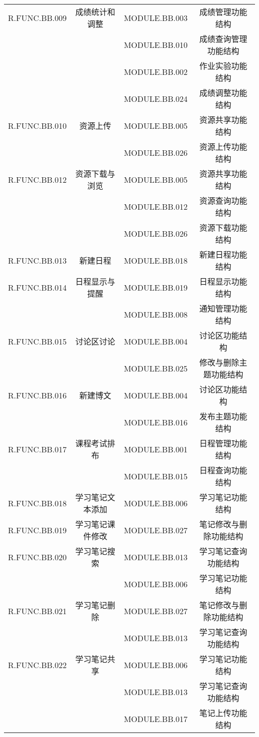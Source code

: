 \begin{longtable}{|c|c|c|c|}
R.FUNC.BB.009   &   成绩统计和调整   &    MODULE.BB.003   &   成绩管理功能结构     \\
    &   &   MODULE.BB.010   &   成绩查询管理功能结构  \\
    &   &   MODULE.BB.002  &  作业实验功能结构  \\ 
    &   &   MODULE.BB.024   & 成绩调整功能结构  \\

R.FUNC.BB.010   &   资源上传   &    MODULE.BB.005   &   资源共享功能结构   \\
    &   &   MODULE.BB.026  &  资源上传功能结构  \\

R.FUNC.BB.012   &   资源下载与浏览   &   MODULE.BB.005   &   资源共享功能结构   \\
    &   &   MODULE.BB.012  &  资源查询功能结构  \\
    &   &   MODULE.BB.026  &  资源下载功能结构  \\

R.FUNC.BB.013   &   新建日程   &   MODULE.BB.018   &   新建日程功能结构   \\

R.FUNC.BB.014   &   日程显示与提醒   &   MODULE.BB.019  &  日程显示功能结构   \\
    &   &   MODULE.BB.008  &  通知管理功能结构 \\

R.FUNC.BB.015   &   讨论区讨论   &  MODULE.BB.004   & 讨论区功能结构   \\
    &   &   MODULE.BB.025  &  修改与删除主题功能结构\\

R.FUNC.BB.016   &   新建博文   &   MODULE.BB.004  &  讨论区功能结构   \\
    &   &   MODULE.BB.016  &  发布主题功能结构  \\  

R.FUNC.BB.017   &   课程考试排布   &   MODULE.BB.001  &  日程管理功能结构   \\
    &   &   MODULE.BB.015  &  日程查询功能结构  \\

R.FUNC.BB.018   &   学习笔记文本添加   &   MODULE.BB.006  &  学习笔记功能结构    \\

R.FUNC.BB.019   &   学习笔记课件修改   &   MODULE.BB.027  &  笔记修改与删除功能结构   \\

R.FUNC.BB.020   &   学习笔记搜索   &   MODULE.BB.013  &  学习笔记查询功能结构   \\
    &   &   MODULE.BB.006  &  学习笔记功能结构    \\

R.FUNC.BB.021   &   学习笔记删除   &   MODULE.BB.027  &  笔记修改与删除功能结构   \\
    &   &   MODULE.BB.013  &  学习笔记查询功能结构   \\

R.FUNC.BB.022   &   学习笔记共享   &   MODULE.BB.006  &  学习笔记功能结构 \\
    &   &   MODULE.BB.013  &  学习笔记查询功能结构   \\
    &   &   MODULE.BB.017  &  笔记上传功能结构  \\



\end{longtable}